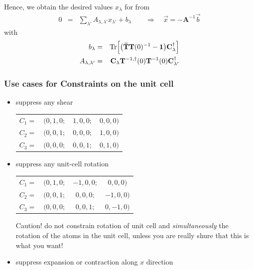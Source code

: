 \documentclass[final,12pt,makeidx,DIV=calc]{article}
\newcommand{\mat}[1]{\mathbf{#1}}
\newcommand{\Tr}{\mathrm{Tr}}      %
\begin{document}
{{{{{{Hence, we obtain the desired values $x_\lambda$ for from
  \begin{eqnarray}
0&=&\sum_{\lambda'}A_{\lambda,\lambda'}x_{\lambda'}+b_\lambda 
\qquad\Rightarrow\quad \vec{x}=-\mat{A}^{-1}\vec{b}
  \end{eqnarray}
with
  \begin{eqnarray}
    b_\lambda&=&\Tr\Bigl[\bigl(\mat{\bar{T}}\mat{T}(0)^{-1}-\mat{1}\bigr)
                      \mat{C}_\lambda^\dagger\Bigr]
 \nonumber\\
    A_{\lambda,\lambda'}
        &=&\mat{C}_\lambda \mat{T}^{-1,\dagger}(0)\mat{T}^{-1}(0)\mat{C}^\dagger_{\lambda'}
  \end{eqnarray}



\subsubsection{Use cases for Constraints on the unit cell}
\label{sec:usecasecellconstr}
\begin{itemize}
    \item suppress any shear
\begin{center}
\begin{tabular}{|cccc|}
\hline
$C_1=$&$(0,1,0;$&$ 1,0,0 ;$&$ 0,0,0)$\\
$C_2=$&$(0,0,1;$&$ 0,0,0 ;$&$ 1,0,0)$\\
$C_3=$&$(0,0,0;$&$ 0,0,1 ;$&$ 0,1,0)$\\
\hline
\end{tabular}
\end{center}
%
\item suppress any unit-cell rotation\\
\begin{center}
\begin{tabular}{|cccc|}
\hline
$C_1=$&$(0,1,0;$&$ -1,0,0;$&$ 0,0,0)$\\
$C_2=$&$(0,0,1;$&$ 0,0,0 ;$&$ -1,0,0)$\\
$C_3=$&$(0,0,0;$&$ 0,0,1 ;$&$ 0,-1,0)$\\
\hline
\end{tabular}
\end{center}
Caution! do not constrain rotation of unit cell and
\textit{simultaneously} the rotation of the atoms in the unit cell,
unless you are really shure that this is what you want!
%
\item suppress expansion or contraction along $x$ direction

\end{itemize}}}}}}}
\end{document}
